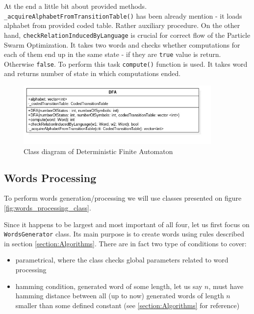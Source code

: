 \documentclass{article}
\begin{document}
At the end a little bit about provided methods. \texttt{\_acquireAlphabetFromTransitionTable()} has been already mention - it loads alphabet from provided coded table. Rather auxiliary procedure. On the other hand, \texttt{checkRelationInducedByLanguage} is crucial for correct flow of the Particle Swarm Optimization. It takes two words and checks whether computations for each of them end up in the same state - if they are \texttt{true} value is return. Otherwise \texttt{false}. To perform this task \texttt{compute()} function is used. It takes word and returns number of state in which computations ended.

\begin{figure}[H]
	\centering
	\includegraphics[width=0.9\textwidth]{images/dfa.jpg}
    \caption{Class diagram of Deterministic Finite Automaton}
    \label{fig:dfa_class}
\end{figure}

%
%
\newpage
\subsection{Words Processing}
To perform words generation/processing we will use classes presented on figure \ref{fig:words_processing_class}.

Since it happens to be largest and most important of all four, let us first focus on \texttt{WordsGenerator} class. Its main purpose is to create words using rules described in section \ref{section:Algorithms}. There are in fact two type of conditions to cover:
\begin{itemize}
\item parametrical, where the class checks global parameters related to word processing
\item hamming condition, generated word of some length, let us say $n$, must have hamming distance between all (up to now) generated words of length $n$ smaller than some defined constant (see \ref{section:Algorithms} for reference)
\end{itemize}
\end{document}

